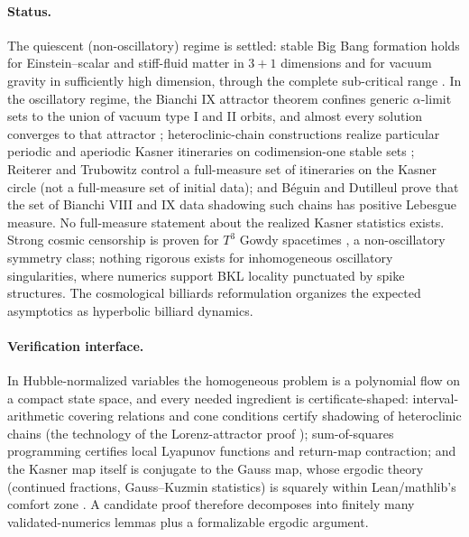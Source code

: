 \documentclass[11pt,letterpaper]{article}
\begin{document}
\paragraph{Status.} The quiescent (non-oscillatory) regime is settled: stable Big Bang formation holds for Einstein--scalar and stiff-fluid matter in $3{+}1$ dimensions and for vacuum gravity in sufficiently high dimension, through the complete sub-critical range \cite{rodnianskispeck2018,frs2023}. In the oscillatory regime, the Bianchi IX attractor theorem \cite{ringstrom2001} confines generic $\alpha$-limit sets to the union of vacuum type I and II orbits, and almost every solution converges to that attractor \cite{brehm2016}; heteroclinic-chain constructions realize particular periodic and aperiodic Kasner itineraries on codimension-one stable sets \cite{liebscher2011,beguin2010}; Reiterer and Trubowitz \cite{reiterertrubowitz2010} control a full-measure set of itineraries on the Kasner circle (not a full-measure set of initial data); and B\'eguin and Dutilleul \cite{beguindutilleul2023} prove that the set of Bianchi VIII and IX data shadowing such chains has positive Lebesgue measure. No full-measure statement about the realized Kasner statistics exists. Strong cosmic censorship is proven for $T^3$ Gowdy spacetimes \cite{ringstrom2009}, a non-oscillatory symmetry class; nothing rigorous exists for inhomogeneous oscillatory singularities, where numerics \cite{garfinkle2004} support BKL locality punctuated by spike structures. The cosmological billiards reformulation \cite{dhn2003} organizes the expected asymptotics as hyperbolic billiard dynamics.

\paragraph{Verification interface.} In Hubble-normalized variables \cite{wainwrighthsu1989} the homogeneous problem is a polynomial flow on a compact state space, and every needed ingredient is certificate-shaped: interval-arithmetic covering relations and cone conditions certify shadowing of heteroclinic chains (the technology of the Lorenz-attractor proof \cite{tucker2002}); sum-of-squares programming \cite{parrilo2003} certifies local Lyapunov functions and return-map contraction; and the Kasner map itself is conjugate to the Gauss map, whose ergodic theory (continued fractions, Gauss--Kuzmin statistics) is squarely within Lean/mathlib's comfort zone \cite{mathlib2020}. A candidate proof therefore decomposes into finitely many validated-numerics lemmas plus a formalizable ergodic argument.
\end{document}
